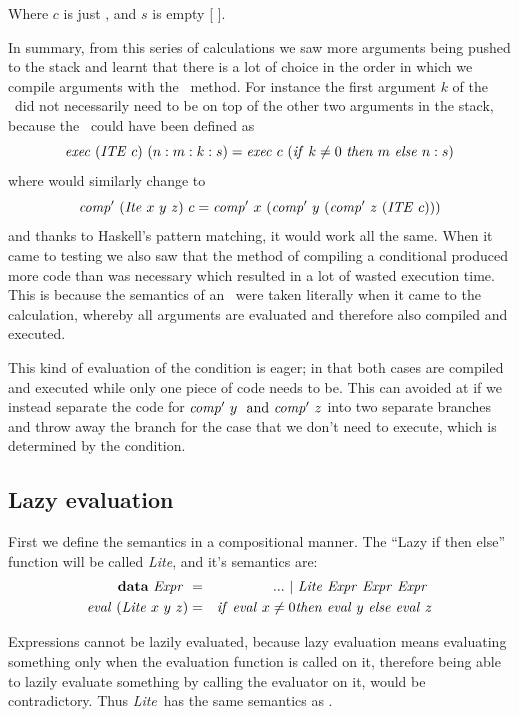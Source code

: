 \documentclass {article}
\begin{document}
\noindent Where $c$ is just \HALTt, and $s$ is empty [ ].

In summary, from this series of calculations we saw more
arguments being pushed to the stack and learnt that
there is a lot of choice in the order in which we
compile arguments with the \BH\ method. 
For instance the first argument $k$
of the \ite\ did not necessarily need to be on top
of the other two arguments in the stack, because
the \exec\ could have been defined as
\[ \mathit{exec\ } (\mathit{ITE\ } c)\ (n:m:k:s) 
		= \mathit{exec\ } c\ (\mathit{if\ } k \not= 0\ \mathit{then\ } m\ \mathit{else\ } n:s) \]
\noindent where \compp would similarly change to
\[ \mathit{comp'\ } (\mathit{Ite\ } x\ y\ z)\ c = 
		\mathit{comp'\ }  x\ (\mathit{comp'\ }  y\ (\mathit{comp'\ }  z\ (\mathit{ITE\ } c))) \]
\noindent and thanks to Haskell's pattern matching,
it would work all the same.
When it came to testing we also saw that the method
of compiling a conditional produced more code than was 
necessary which resulted in a lot of wasted
execution time. 
This is because the semantics of an \ite\ were
taken literally when it came to the calculation,
whereby all arguments are evaluated
and therefore also compiled and executed.

This kind of evaluation of the condition
is eager; in that both cases are compiled and executed
while only one piece of code needs to be.
This can avoided at if we instead
separate the code for
\( \mathit{comp'\ }  y\ \mbox{ and } \mathit{comp'\ }  z \) 
into two separate branches
and throw away the branch for the case
that we don't need to execute, which
is determined by the condition.

\pagebreak
\subsection{Lazy evaluation} \label{lazycon}

\newcommand{\lite}{\textit{Lite}}
\newcommand{\Lite}{\mathit{Lite\ }}
First we define the semantics 
in a compositional manner.
The ``Lazy if then else'' function
 will be called \lite, and it's semantics are:
 \begin{eqnarray}
 \textbf{data}\ \Expr &=& ...\ |\ \Lite \Expr \Expr \Expr \nonumber \\
 \evalf (\Lite x\ y\ z)
	&=& \ifff \evalf  x \not= 0 \tthen \evalf  y\ \eelse \evalf  z 
			\label{evallite}
 \end{eqnarray}

Expressions cannot be lazily evaluated,
because lazy evaluation means evaluating
something only when the evaluation function
is called on it,
therefore being able to lazily evaluate something 
by calling the evaluator on it,
would be contradictory.
Thus \lite\ has the same semantics
as \ite.
\end{document}
